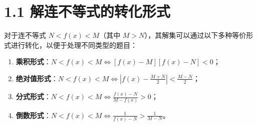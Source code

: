 \section*{1.1 解连不等式的转化形式}

对于连不等式 \( N < f(x) < M \)（其中 \( M > N \)），其解集可以通过以下多种等价形式进行转化，以便于处理不同类型的题目：

\begin{enumerate}
    \item \textbf{乘积形式}：\( N < f(x) < M \iff [f(x) - M][f(x) - N] < 0 \)；
    
    \item \textbf{绝对值形式}：\( N < f(x) < M \iff \left| f(x) - \frac{M+N}{2} \right| < \frac{M-N}{2} \)；
    
    \item \textbf{分式形式}：\( N < f(x) < M \iff \frac{f(x)-N}{M-f(x)} > 0 \)；
    
    \item \textbf{倒数形式}：\( N < f(x) < M \iff \frac{1}{f(x)-N} > \frac{1}{M-N} \)。
\end{enumerate}
